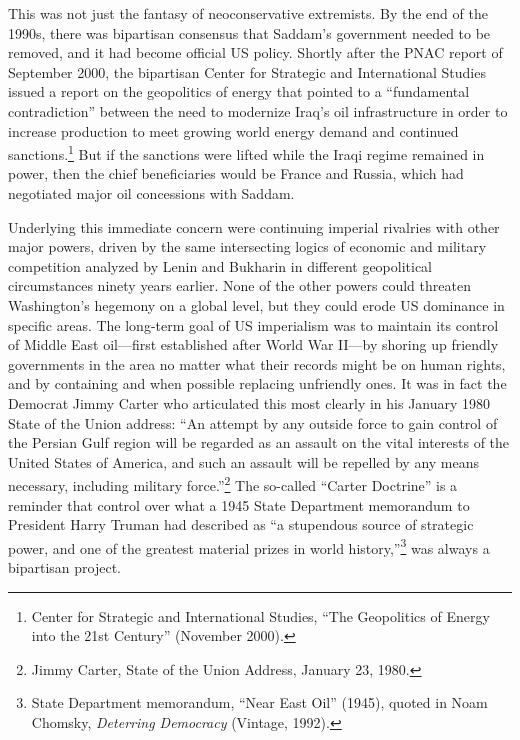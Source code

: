 This was not just the fantasy of neoconservative extremists. By the end of the 1990s, there was bipartisan consensus that Saddam's government needed to be removed, and it had become official US policy. Shortly after the PNAC report of September 2000, the bipartisan Center for Strategic and International Studies issued a report on the geopolitics of energy that pointed to a ``fundamental contradiction'' between the need to modernize Iraq's oil infrastructure in order to increase production to meet growing world energy demand and continued sanctions.\footnote{Center for Strategic and International Studies, ``The Geopolitics of Energy into the 21st Century'' (November 2000).} But if the sanctions were lifted while the Iraqi regime remained in power, then the chief beneficiaries would be France and Russia, which had negotiated major oil concessions with Saddam.

Underlying this immediate concern were continuing imperial rivalries with other major powers, driven by the same intersecting logics of economic and military competition analyzed by Lenin and Bukharin in different geopolitical circumstances ninety years earlier. None of the other powers could threaten Washington's hegemony on a global level, but they could erode US dominance in specific areas. The long-term goal of US imperialism was to maintain its control of Middle East oil---first established after World War II---by shoring up friendly governments in the area no matter what their records might be on human rights, and by containing and when possible replacing unfriendly ones. It was in fact the Democrat Jimmy Carter who articulated this most clearly in his January 1980 State of the Union address: ``An attempt by any outside force to gain control of the Persian Gulf region will be regarded as an assault on the vital interests of the United States of America, and such an assault will be repelled by any means necessary, including military force.''\footnote{Jimmy Carter, State of the Union Address, January 23, 1980.} The so-called ``Carter Doctrine'' is a reminder that control over what a 1945 State Department memorandum to President Harry Truman had described as ``a stupendous source of strategic power, and one of the greatest material prizes in world history,''\footnote{State Department memorandum, ``Near East Oil'' (1945), quoted in Noam Chomsky, \emph{Deterring Democracy} (Vintage, 1992).} was always a bipartisan project.

